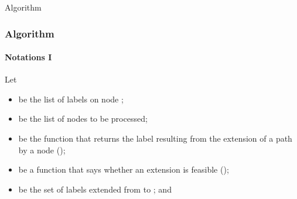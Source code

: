 \begin{frame}
  \begin{center}
    \Huge Algorithm
  \end{center}
\end{frame}

\begin{frame}
  \frametitle{Algorithm}
  \framesubtitle{Notations I}
  Let
  \begin{itemize}
    \item {} be the list of labels on node ;
    \item {} be the list of nodes to be processed;
    \item {}  be the function that returns the label resulting from the extension of a path  by a node  ();
    \item \blue{\[
        f(S_i, j) =  
        \begin{cases}
          \text{\textcolor{black}{true}},  & \text{\textcolor{black}{if} }      \forall r \in R (\text{max} \{l^r_i + d_{ij}^r, b^r_j\}  \leqslant e_i^r) \wedge \neg v_i^j\\
          \text{\textcolor{black}{false}}, & \text{\textcolor{black}{otherwise}}
        \end{cases}
    \]} be a function that says whether an extension is feasible ();
    \item {} be the set of labels extended from  to ; and
  \end{itemize}
\end{frame}

